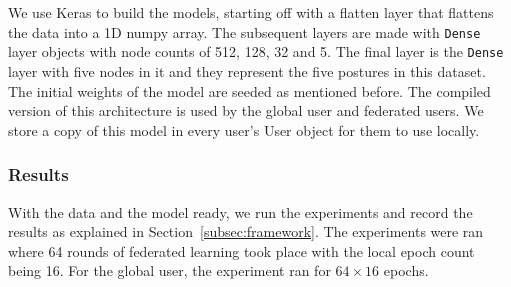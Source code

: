 \documentclass[12pt]{article}
\begin{document}
\noindent We use Keras to build the models, starting off with a flatten layer that flattens the data into a 1D numpy array. The subsequent layers are made with \texttt{Dense} layer objects with node counts of 512, 128, 32 and 5. The final layer is the \texttt{Dense} layer with five nodes in it and they represent the five postures in this dataset. The initial weights of the model are seeded as mentioned before. The compiled version of this architecture is used by the global user and federated users. We store a copy of this model in every user's User object for them to use locally.
\subsubsection{Results}
With the data and the model ready, we run the experiments and record the results as explained in Section~\ref{subsec:framework}. The experiments were ran where 64 rounds of federated learning took place with the local epoch count being 16. For the global user, the experiment ran for $64 \times 16$ epochs.
\\\\
\end{document}

